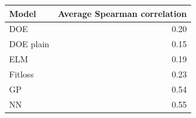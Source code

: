 \begin{tabular}{lr}
\toprule
Model & Average Spearman correlation \\
\midrule
DOE & 0.20 \\
DOE plain & 0.15 \\
ELM & 0.19 \\
Fitloss & 0.23 \\
GP & 0.54 \\
NN & 0.55 \\
\bottomrule
\end{tabular}
